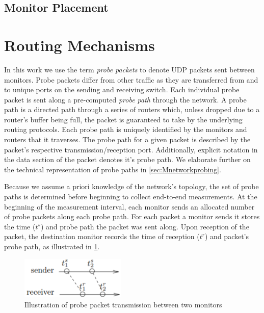 \subsection{Monitor Placement}
\label{ssec:Bmonitorplacement}

\section{Routing Mechanisms}
\label{sec:Broutingmechanisms}

In this work we use the term \textit{probe packets} to denote UDP packets sent between monitors. Probe packets differ from other traffic as they are transferred from and to unique ports on the sending and receiving switch. Each individual probe packet is sent along a pre-computed \emph{probe path} through the network. A probe path is a directed path through a series of routers which, unless dropped due to a router's buffer being full, the packet is guaranteed to take by the underlying routing protocols. Each probe path is uniquely identified by the monitors and routers that it traverses. The probe path for a given packet is described by the packet's respective transmission/reception port. Additionally, explicit notation in the data section of the packet denotes it's probe path. We elaborate further on the technical representation of probe paths in \cref{sec:Mnetworkprobing}.\par
Because we assume a priori knowledge of the network's topology, the set of probe paths is determined before beginning to collect end-to-end measurements. At the beginning of the measurement interval, each monitor sends an allocated number of probe packets along each probe path. For each packet a monitor sends it stores the time ($t^s$) and probe path the packet was sent along. Upon reception of the packet, the destination monitor records the time of reception ($t^r$) and packet's probe path, as illustrated in \ref{fig:pptransmission}. 
\begin{figure}[H]
    \centering
    \includegraphics[width=5cm]{figs/background/probe_transmission.png}
    \caption[Illustration of probe packet transmission between two monitors]{Illustration of probe packet transmission between two monitors \protect\cite{he_fisher_2015}}
    \label{fig:pptransmission}
\end{figure}
